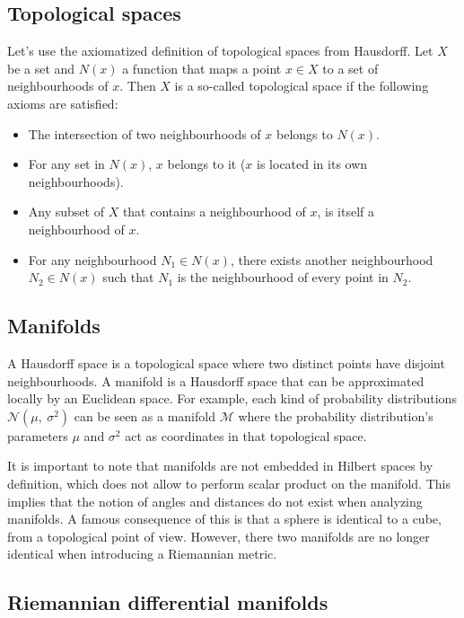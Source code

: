\documentclass[a4paper,11pt]{report}
\begin{document}
\subsection{Topological spaces}

Let's use the axiomatized definition of topological spaces from Hausdorff.
Let $X$ be a set and $N(x)$ a function that maps a point $x \in X$ to a set of neighbourhoods of $x$.
Then $X$ is a so-called topological space if the following axioms are satisfied:
\begin{itemize}
  \item The intersection of two neighbourhoods of $x$ belongs to $N(x)$.
  \item For any set in $N(x)$, $x$ belongs to it ($x$ is located in its own neighbourhoods).
  \item Any subset of $X$ that contains a neighbourhood of $x$, is itself a neighbourhood of $x$.
  \item For any neighbourhood $N_1 \in N(x)$, there exists another neighbourhood $N_2 \in N(x)$
  such that $N_1$ is the neighbourhood of every point in $N_2$.
\end{itemize}


\subsection{Manifolds}

A Hausdorff space is a topological space where two distinct points have disjoint neighbourhoods.
A manifold is a Hausdorff space that can be approximated locally by an Euclidean space. For example, each kind of probability distributions $\mathcal{N}(\mu,\ \sigma^2)$ can be seen as a manifold $\mathcal{M}$ where the probability distribution's parameters $\mu$ and $\sigma^2$ act as coordinates in that topological space.

It is important to note that manifolds are not embedded in Hilbert spaces by definition, which does not allow to perform scalar product on the manifold.
This implies that the notion of angles and distances do not exist when analyzing manifolds. A famous consequence of this is that a sphere is identical
to a cube, from a topological point of view. However, there two manifolds are no longer identical when introducing a Riemannian metric.

\subsection{Riemannian differential manifolds}
\end{document}
